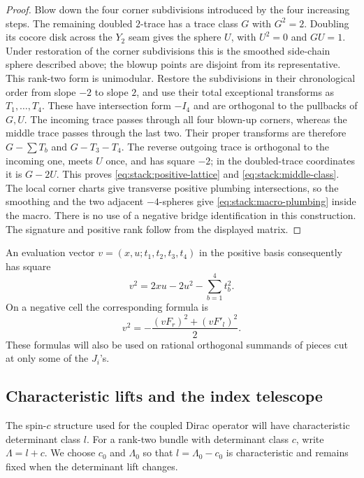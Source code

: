 \begin{proof}
Blow down the four corner subdivisions introduced by the four
increasing steps.  The remaining doubled \(2\)-trace has a trace class
\(G\) with \(G^2=2\).  Doubling its cocore disk across the
\(Y_2\) seam gives the sphere \(U\), with \(U^2=0\) and
\(GU=1\).  Under restoration of the corner subdivisions this is
the smoothed side-chain sphere described above; the blowup points
are disjoint from its representative.  This rank-two form is unimodular.
Restore the subdivisions in their chronological order from slope
\(-2\) to slope \(2\), and use their total exceptional transforms
as \(T_1,\ldots,T_4\).  These have intersection form \(-I_4\) and
are orthogonal to the pullbacks of \(G,U\).  The incoming trace passes
through all four blown-up corners, whereas the middle trace passes
through the last two.  Their proper transforms are therefore
\(G-\sum T_b\) and \(G-T_3-T_4\).  The reverse outgoing trace is
orthogonal to the incoming one, meets \(U\) once, and has square
\(-2\); in the doubled-trace coordinates it is \(G-2U\).
This proves \eqref{eq:stack:positive-lattice} and
\eqref{eq:stack:middle-class}.  The local corner charts give transverse
positive plumbing intersections, so the smoothing and the two adjacent
\(-4\)-spheres give \eqref{eq:stack:macro-plumbing} inside the macro.
There is no use of a negative bridge identification in this construction.
The signature and positive rank follow from the displayed matrix.
\end{proof}

An evaluation vector \(v=(x,u;t_1,t_2,t_3,t_4)\) in the positive
basis consequently has square
\begin{equation}
 v^2=2xu-2u^2-\sum_{b=1}^4t_b^2.
\label{eq:stack:positive-dual-square}
\end{equation}
On a negative cell the corresponding formula is
\begin{equation}
 v^2=-\frac{(vF_r)^2+(vF'_l)^2}{2}.
\label{eq:stack:negative-dual-square}
\end{equation}
These formulas will also be used on rational orthogonal summands of
pieces cut at only some of the \(J_i\)'s.

\subsection{Characteristic lifts and the index telescope}

The spin-\(c\) structure used for the coupled Dirac operator will have
characteristic determinant class \(l\).  For a rank-two bundle with
determinant class \(c\), write \(\Lambda=l+c\).  We choose \(c_0\)
and \(\Lambda_0\) so that \(l=\Lambda_0-c_0\) is characteristic
and remains fixed when the determinant lift changes.

